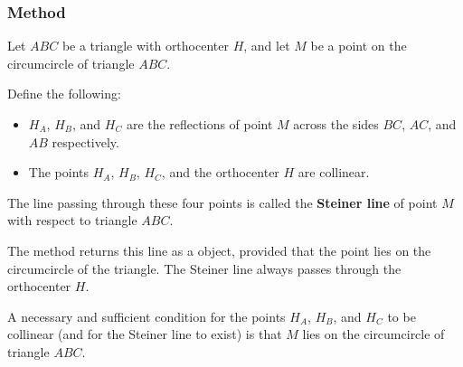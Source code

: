 \subsubsection{Method } %
\label{ssub:method_triangle_steiner__line}

Let $ABC$ be a triangle with orthocenter $H$, and let $M$ be a point on the circumcircle of triangle $ABC$.

\medskip

Define the following:
\begin{itemize}
  \item $H_A$, $H_B$, and $H_C$ are the reflections of point $M$ across the sides $BC$, $AC$, and $AB$ respectively.
  \item The points $H_A$, $H_B$, $H_C$, and the orthocenter $H$ are collinear.
\end{itemize}


The line passing through these four points is called the \textbf{Steiner line} of point $M$ with respect to triangle $ABC$.

\medskip

The method  returns this line as a  object, provided that the point  lies on the circumcircle of the triangle. The Steiner line always passes through the orthocenter $H$.

\medskip

A necessary and sufficient condition for the points $H_A$, $H_B$, and $H_C$ to be collinear (and for the Steiner line to exist) is that $M$ lies on the circumcircle of triangle $ABC$.

\vspace{1em}

\begin{tkzexample}[vbox]
\begin{center}
\end{center}
\end{tkzexample}

